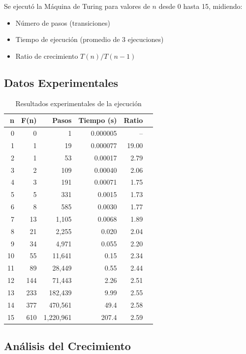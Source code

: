 \documentclass[12pt,a4paper]{article}
\begin{document}
Se ejecutó la Máquina de Turing para valores de $n$ desde 0 hasta 15, midiendo:
\begin{itemize}
    \item Número de pasos (transiciones)
    \item Tiempo de ejecución (promedio de 3 ejecuciones)
    \item Ratio de crecimiento $T(n)/T(n-1)$
\end{itemize}

\subsection{Datos Experimentales}

\begin{table}[H]
\centering
\begin{tabular}{rrrrrr}
\toprule
\textbf{n} & \textbf{F(n)} & \textbf{Pasos} & \textbf{Tiempo (s)} & \textbf{Ratio} \\
\midrule
0 & 0 & 1 & 0.000005 & -- \\
1 & 1 & 19 & 0.000077 & 19.00 \\
2 & 1 & 53 & 0.00017 & 2.79 \\
3 & 2 & 109 & 0.00040 & 2.06 \\
4 & 3 & 191 & 0.00071 & 1.75 \\
5 & 5 & 331 & 0.0015 & 1.73 \\
6 & 8 & 585 & 0.0030 & 1.77 \\
7 & 13 & 1,105 & 0.0068 & 1.89 \\
8 & 21 & 2,255 & 0.020 & 2.04 \\
9 & 34 & 4,971 & 0.055 & 2.20 \\
10 & 55 & 11,641 & 0.15 & 2.34 \\
11 & 89 & 28,449 & 0.55 & 2.44 \\
12 & 144 & 71,443 & 2.26 & 2.51 \\
13 & 233 & 182,439 & 9.99 & 2.55 \\
14 & 377 & 470,561 & 49.4 & 2.58 \\
15 & 610 & 1,220,961 & 207.4 & 2.59 \\
\bottomrule
\end{tabular}
\caption{Resultados experimentales de la ejecución}
\label{tab:resultados}
\end{table}

\subsection{Análisis del Crecimiento}
\end{document}
